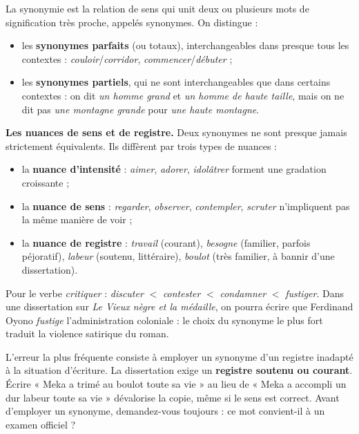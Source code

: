 \documentclass[11pt]{article}
\newcommand{\cle}[1]{{\popxbold\color{popdark}#1}}
\begin{document}
\begin{definition}[La synonymie]
La \cle{synonymie} est la relation de sens qui unit deux ou plusieurs mots de signification très proche, appelés \cle{synonymes}. On distingue :
\begin{itemize}
\item les \textbf{synonymes parfaits} (ou totaux), interchangeables dans presque tous les contextes : \emph{couloir}/\emph{corridor}, \emph{commencer}/\emph{débuter} ;
\item les \textbf{synonymes partiels}, qui ne sont interchangeables que dans certains contextes : on dit \emph{un homme grand} et \emph{un homme de haute taille}, mais on ne dit pas \emph{une montagne grande} pour \emph{une haute montagne}.
\end{itemize}
\end{definition}

\textbf{Les nuances de sens et de registre.} Deux synonymes ne sont presque jamais strictement équivalents. Ils diffèrent par trois types de nuances :

\begin{itemize}
\item la \textbf{nuance d'intensité} : \emph{aimer}, \emph{adorer}, \emph{idolâtrer} forment une gradation croissante ;
\item la \textbf{nuance de sens} : \emph{regarder}, \emph{observer}, \emph{contempler}, \emph{scruter} n'impliquent pas la même manière de voir ;
\item la \textbf{nuance de registre} : \emph{travail} (courant), \emph{besogne} (familier, parfois péjoratif), \emph{labeur} (soutenu, littéraire), \emph{boulot} (très familier, à bannir d'une dissertation).
\end{itemize}

\begin{exemplebox}
Pour le verbe \emph{critiquer} : \emph{discuter} $<$ \emph{contester} $<$ \emph{condamner} $<$ \emph{fustiger}. Dans une dissertation sur \emph{Le Vieux nègre et la médaille}, on pourra écrire que Ferdinand Oyono \emph{fustige} l'administration coloniale : le choix du synonyme le plus fort traduit la violence satirique du roman.
\end{exemplebox}

\begin{attention}
L'erreur la plus fréquente consiste à employer un synonyme d'un registre inadapté à la situation d'écriture. La dissertation exige un \textbf{registre soutenu ou courant}. Écrire « Meka a trimé au boulot toute sa vie » au lieu de « Meka a accompli un dur labeur toute sa vie » dévalorise la copie, même si le sens est correct. Avant d'employer un synonyme, demandez-vous toujours : ce mot convient-il à un examen officiel ?
\end{attention}
\end{document}
